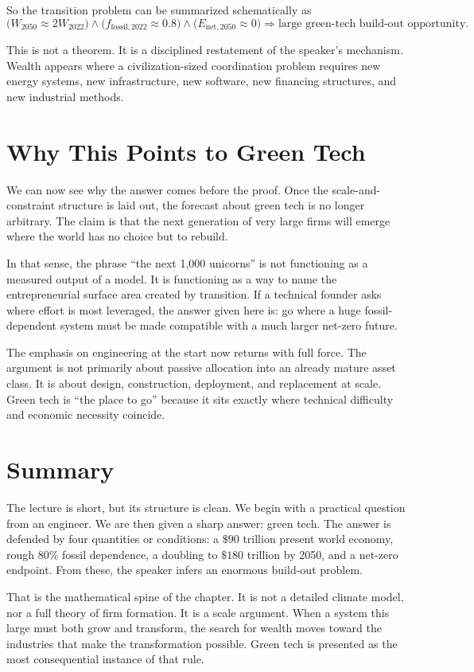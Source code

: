 So the transition problem can be summarized schematically as
\begin{equation}
\bigl(W_{2050} \approx 2W_{2022}\bigr)
\land
\bigl(f_{\mathrm{fossil},2022} \approx 0.8\bigr)
\land
\bigl(E_{\mathrm{net},2050} \approx 0\bigr)
\Rightarrow
\text{large green-tech build-out opportunity}.
\end{equation}

This is not a theorem. It is a disciplined restatement of the speaker's mechanism. Wealth appears where a civilization-sized coordination problem requires new energy systems, new infrastructure, new software, new financing structures, and new industrial methods.

\section{Why This Points to Green Tech}

We can now see why the answer comes before the proof. Once the scale-and-constraint structure is laid out, the forecast about green tech is no longer arbitrary. The claim is that the next generation of very large firms will emerge where the world has no choice but to rebuild.

In that sense, the phrase ``the next 1{,}000 unicorns'' is not functioning as a measured output of a model. It is functioning as a way to name the entrepreneurial surface area created by transition. If a technical founder asks where effort is most leveraged, the answer given here is: go where a huge fossil-dependent system must be made compatible with a much larger net-zero future.

The emphasis on engineering at the start now returns with full force. The argument is not primarily about passive allocation into an already mature asset class. It is about design, construction, deployment, and replacement at scale. Green tech is ``the place to go'' because it sits exactly where technical difficulty and economic necessity coincide.

\section{Summary}

The lecture is short, but its structure is clean. We begin with a practical question from an engineer. We are then given a sharp answer: green tech. The answer is defended by four quantities or conditions: a \(\$90\) trillion present world economy, rough \(80\%\) fossil dependence, a doubling to \(\$180\) trillion by 2050, and a net-zero endpoint. From these, the speaker infers an enormous build-out problem.

That is the mathematical spine of the chapter. It is not a detailed climate model, nor a full theory of firm formation. It is a scale argument. When a system this large must both grow and transform, the search for wealth moves toward the industries that make the transformation possible. Green tech is presented as the most consequential instance of that rule.